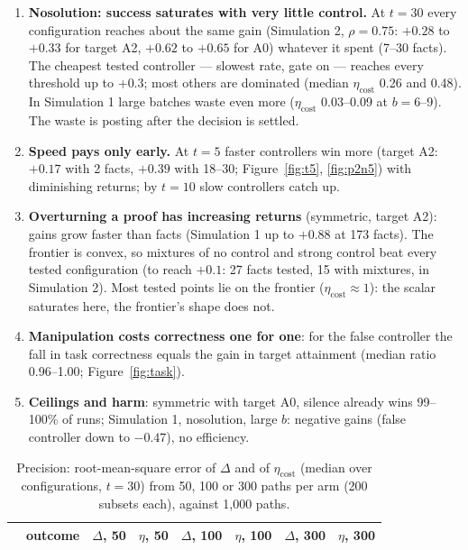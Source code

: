 \documentclass[10pt,a4paper]{article}
\begin{document}
\begin{enumerate}\itemsep2pt
\item \textbf{Nosolution: success saturates with very little control.} At $t = 30$ every configuration
  reaches about the same gain (Simulation 2, $\rho = 0.75$: $+0.28$ to $+0.33$ for target A2, $+0.62$ to
  $+0.65$ for A0) whatever it spent (7--30 facts). The cheapest tested controller --- slowest rate, gate
  on --- reaches every threshold up to $+0.3$; most others are dominated (median $\eta_{\text{cost}}$
  0.26 and 0.48). In Simulation 1 large batches waste even more ($\eta_{\text{cost}}$ 0.03--0.09 at
  $b = 6$--9). The waste is posting after the decision is settled.
\item \textbf{Speed pays only early.} At $t = 5$ faster controllers win more (target A2: $+0.17$ with
  2 facts, $+0.39$ with 18--30; Figure~\ref{fig:t5}, \ref{fig:p2n5}) with diminishing returns; by
  $t = 10$ slow controllers catch up.
\item \textbf{Overturning a proof has increasing returns} (symmetric, target A2): gains grow faster than
  facts (Simulation 1 up to $+0.88$ at 173 facts). The frontier is convex, so mixtures of no control and
  strong control beat every tested configuration (to reach $+0.1$: 27 facts tested, 15 with mixtures, in
  Simulation 2). Most tested points lie on the frontier ($\eta_{\text{cost}} \approx 1$): the scalar
  saturates here, the frontier's shape does not.
\item \textbf{Manipulation costs correctness one for one}: for the false controller the fall in task
  correctness equals the gain in target attainment (median ratio 0.96--1.00; Figure~\ref{fig:task}).
\item \textbf{Ceilings and harm}: symmetric with target A0, silence already wins 99--100\% of runs;
  Simulation 1, nosolution, large $b$: negative gains (false controller down to $-0.47$), no efficiency.
\end{enumerate}

\begin{table}[H]
\centering\small
\caption{Precision: root-mean-square error of $\Delta$ and of $\eta_{\text{cost}}$ (median over configurations,
$t = 30$) from 50, 100 or 300 paths per arm (200 subsets each), against 1{,}000 paths.}
\begin{tabular}{llcccccc}
\toprule
 & outcome & $\Delta$, 50 & $\eta$, 50 & $\Delta$, 100 & $\eta$, 100 & $\Delta$, 300 & $\eta$, 300 \\
\midrule
\bottomrule
\end{tabular}
\end{table}
\end{document}
